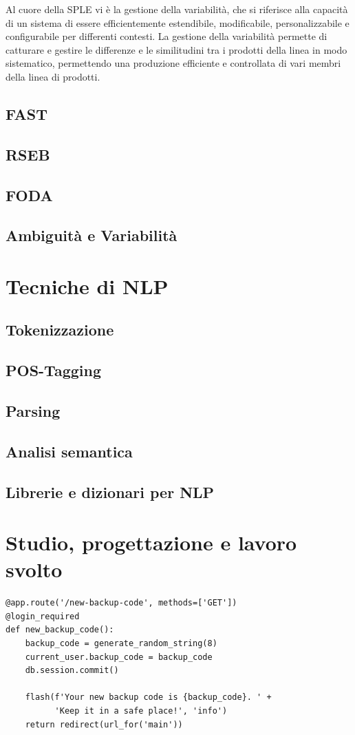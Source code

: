 \documentclass[12pt]{report}
\begin{document}
Al cuore della SPLE vi è la gestione della variabilità, che si riferisce alla capacità di un sistema di essere efficientemente estendibile, modificabile, personalizzabile e configurabile per differenti contesti. La gestione della variabilità permette di catturare e gestire le differenze e le similitudini tra i prodotti della linea in modo sistematico, permettendo una produzione efficiente e controllata di vari membri della linea di prodotti.


\section{FAST}
\section{RSEB}
\section{FODA}
\section{Ambiguità e Variabilità}


\chapter{Tecniche di NLP}

\section{Tokenizzazione}
\section{POS-Tagging}
\section{Parsing}
\section{Analisi semantica}
\section{Librerie e dizionari per NLP}


\chapter{Studio, progettazione e lavoro svolto}
\begin{addmargin}[0.5cm]{0cm}
\begin{lstlisting}
@app.route('/new-backup-code', methods=['GET'])
@login_required
def new_backup_code():
    backup_code = generate_random_string(8)
    current_user.backup_code = backup_code
    db.session.commit()

    flash(f'Your new backup code is {backup_code}. ' +
          'Keep it in a safe place!', 'info')
    return redirect(url_for('main'))
\end{lstlisting}
\end{addmargin}
\end{document}

